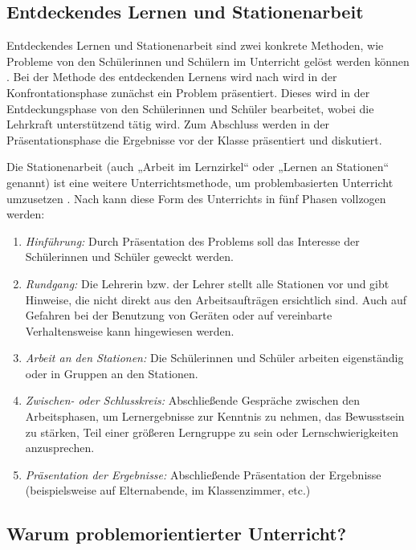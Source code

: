 \documentclass[jour,12pt,a4paper]{apa6}
\begin{document}
\subsection{Entdeckendes Lernen und Stationenarbeit}

Entdeckendes Lernen und Stationenarbeit sind zwei konkrete Methoden, wie Probleme von den Schülerinnen und Schülern im Unterricht gelöst werden können \parencite{kunter2013}. Bei der Methode des entdeckenden Lernens wird nach \textcite{hameyer2008} wird in der Konfrontationsphase zunächst ein Problem präsentiert. Dieses wird in der Entdeckungsphase von den Schülerinnen und Schüler bearbeitet, wobei die Lehrkraft unterstützend tätig wird. Zum Abschluss werden in der Präsentationsphase die Ergebnisse vor der Klasse präsentiert und diskutiert.

Die Stationenarbeit (auch „Arbeit im Lernzirkel“ oder „Lernen an Stationen“ genannt) ist eine weitere Unterrichtsmethode, um problembasierten Unterricht umzusetzen \parencite{hegele2008}. Nach \textcite{hegele2008} kann diese Form des Unterrichts in fünf Phasen vollzogen werden:

\begin{enumerate}
  \item \emph{Hinführung:} Durch Präsentation des Problems soll das Interesse der Schülerinnen und Schüler geweckt werden.
  \item \emph{Rundgang:} Die Lehrerin bzw. der Lehrer stellt alle Stationen vor und gibt Hinweise, die nicht direkt aus den Arbeitsaufträgen ersichtlich sind. Auch auf Gefahren bei der Benutzung von Geräten oder auf vereinbarte Verhaltensweise kann hingewiesen werden.
  \item \emph{Arbeit an den Stationen:} Die Schülerinnen und Schüler arbeiten eigenständig oder in Gruppen an den Stationen.
  \item \emph{Zwischen- oder Schlusskreis:} Abschließende Gespräche zwischen den Arbeitsphasen, um Lernergebnisse zur Kenntnis zu nehmen, das Bewusstsein zu stärken, Teil einer größeren Lerngruppe zu sein oder Lernschwierigkeiten anzusprechen.
  \item \emph{Präsentation der Ergebnisse:} Abschließende Präsentation der Ergebnisse (beispielsweise auf Elternabende, im Klassenzimmer, etc.)
\end{enumerate}

\subsection{Warum problemorientierter Unterricht?}
\end{document}
